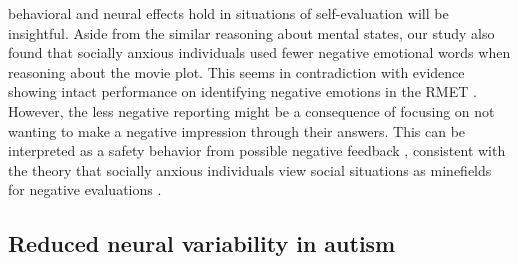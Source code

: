 behavioral and neural effects hold in situations of self-evaluation will be insightful. Aside from the similar reasoning about mental states, our study also found that socially anxious individuals used fewer negative emotional words when reasoning about the movie plot. This seems in contradiction with evidence showing intact performance on identifying negative emotions in the RMET \citep{washburn2016}. However, the less negative reporting might be a consequence of focusing on not wanting to make a negative impression through their answers. This can be interpreted as a safety behavior from possible negative feedback \citep{wells1995}, consistent with the theory that socially anxious individuals view social situations as minefields for negative evaluations \citep{rapee1997}. 

\subsection{Reduced neural variability in autism}
